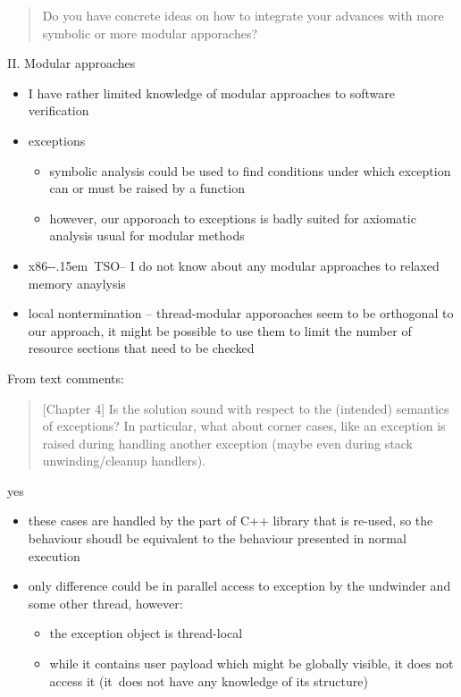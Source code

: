 \documentclass[aspectratio=169, fi]{paradise-slide}
\newcommand{\xtso}{\mbox{x86-\kern-.15em TSO}\xspace}
\newcommand{\rquote}[1]{\begin{quote}#1\end{quote}\bigskip\setlength{\leftmargini}{1em}}
\begin{document}
\begin{frame}[noframenumbering]{\qtitle}
  \rquote{Do you have concrete ideas on how to integrate your advances with more symbolic or more
    modular apporaches?}

  \textrm{II.} Modular approaches
  \begin{itemize}
    \item I have rather limited knowledge of modular approaches to software verification
      \pause
    \item exceptions
      \begin{itemize}
        \item symbolic analysis could be used to find conditions under which exception can
          or must be raised by a function
        \item however, our apporoach to exceptions is badly suited for axiomatic analysis usual for
          modular methods
      \end{itemize}
      \pause
    \item \xtso – I do not know about any modular approaches to relaxed memory anaylysis
      \pause
    \item local nontermination – thread-modular apporoaches seem to be orthogonal to our approach,
      it might be possible to use them to limit the number of resource sections that need to be
      checked
  \end{itemize}
\end{frame}

\begin{frame}[noframenumbering]{\qtitle}
  From text comments:
  \rquote{[Chapter 4] Is the solution sound with respect to the (intended) semantics of exceptions? In
    particular, what about corner cases, like an exception is raised during handling another
    exception (maybe even during stack unwinding/cleanup handlers).}

  yes
  \begin{itemize}
    \item these cases are handled by the part of C++ library that is re-used, so the behaviour
      shoudl be equivalent to the behaviour presented in normal execution
    \item only difference could be in parallel access to exception by the undwinder and some other
      thread, however:
      \begin{itemize}
        \item the exception object is thread-local
        \item while it contains user payload which might be globally visible, it does not access it
          (it~does not have any knowledge of its structure)
      \end{itemize}
  \end{itemize}
\end{frame}
\end{document}
